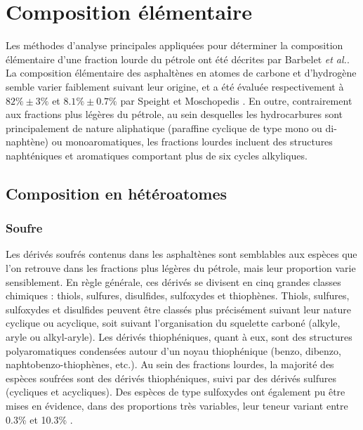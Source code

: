 	\bigskip
	\section{Composition élémentaire}
	
	Les méthodes d'analyse principales appliquées pour déterminer la composition élémentaire d'une fraction lourde du pétrole ont été décrites par Barbelet \textit{et al.}\cite{barbelet1979analyses}. La composition élémentaire des asphaltènes en atomes de carbone et d'hydrogène semble varier faiblement suivant leur origine, et a été évaluée respectivement à $82\% \pm 3\%$ et $8.1\% \pm 0.7\%$ par Speight et Moschopedis \cite{speight1979some}. En outre, contrairement aux fractions plus légères du pétrole, au sein desquelles les hydrocarbures sont principalement de nature aliphatique (paraffine cyclique de type mono ou di-naphtène) ou monoaromatiques, les fractions lourdes incluent des structures naphténiques et aromatiques comportant plus de six cycles alkyliques.
	
	\subsection{Composition en hétéroatomes}
	
	
	\subsubsection{Soufre}
	Les dérivés soufrés contenus dans les asphaltènes sont semblables aux espèces que l'on retrouve dans les fractions plus légères du pétrole, mais leur proportion varie sensiblement. En règle générale, ces dérivés se divisent en cinq grandes classes chimiques : thiols, sulfures, disulfides, sulfoxydes et thiophènes. Thiols, sulfures, sulfoxydes et disulfides peuvent être classés plus précisément suivant leur nature cyclique ou acyclique, soit suivant l'organisation du squelette carboné (alkyle, aryle ou alkyl-aryle). Les dérivés thiophéniques, quant à eux, sont des structures polyaromatiques condensées autour d'un noyau thiophénique (benzo, dibenzo, naphtobenzo-thiophènes, etc.). Au sein des fractions lourdes, la majorité des espèces soufrées sont des dérivés thiophéniques, suivi par des dérivés sulfures (cycliques et acycliques). Des espèces de type sulfoxydes ont également pu être mises en évidence, dans des proportions très variables, leur teneur variant entre 0.3\% et 10.3\% \cite{merdrignac2007physicochemical, speight2004petroleum}.
	

